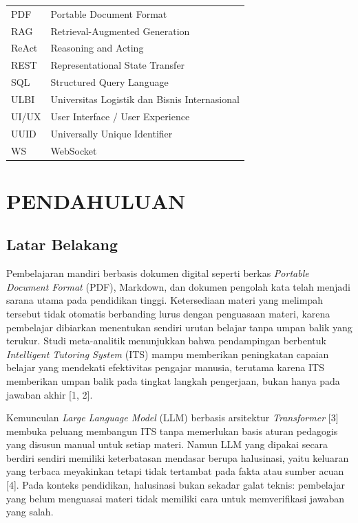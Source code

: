\documentclass[12pt,a4paper]{article}
\begin{document}
\begin{table}[h]
\begin{tabular}{ll}
PDF & Portable Document Format \\

RAG & Retrieval-Augmented Generation \\

ReAct & Reasoning and Acting \\

REST & Representational State Transfer \\

SQL & Structured Query Language \\

ULBI & Universitas Logistik dan Bisnis Internasional \\

UI/UX & User Interface / User Experience \\

UUID & Universally Unique Identifier \\

WS & WebSocket \\

\bottomrule

\end{tabular}

\end{table}

\section*{PENDAHULUAN}

\subsection*{Latar Belakang}

Pembelajaran mandiri berbasis dokumen digital seperti berkas \textit{Portable Document Format} (PDF), Markdown, dan dokumen pengolah kata telah menjadi sarana utama pada pendidikan tinggi. Ketersediaan materi yang melimpah tersebut tidak otomatis berbanding lurus dengan penguasaan materi, karena pembelajar dibiarkan menentukan sendiri urutan belajar tanpa umpan balik yang terukur. Studi meta-analitik menunjukkan bahwa pendampingan berbentuk \textit{Intelligent Tutoring System} (ITS) mampu memberikan peningkatan capaian belajar yang mendekati efektivitas pengajar manusia, terutama karena ITS memberikan umpan balik pada tingkat langkah pengerjaan, bukan hanya pada jawaban akhir {[}1, 2{]}.



Kemunculan \textit{Large Language Model} (LLM) berbasis arsitektur \textit{Transformer} {[}3{]} membuka peluang membangun ITS tanpa memerlukan basis aturan pedagogis yang disusun manual untuk setiap materi. Namun LLM yang dipakai secara berdiri sendiri memiliki keterbatasan mendasar berupa halusinasi, yaitu keluaran yang terbaca meyakinkan tetapi tidak tertambat pada fakta atau sumber acuan {[}4{]}. Pada konteks pendidikan, halusinasi bukan sekadar galat teknis: pembelajar yang belum menguasai materi tidak memiliki cara untuk memverifikasi jawaban yang salah.
\end{document}
